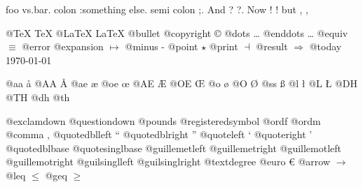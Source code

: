 \documentclass{book}
\begin{document}
foo vs.\@ bar. 
colon :\@And something else.
semi colon ;\@.
And ? ?\@.
Now ! !\@@
but , ,\@

@TeX \TeX{}
@LaTeX \LaTeX{}
@bullet \textbullet{}
@copyright \copyright{}
@dots \dots{}\@
@enddots \dots{}
@equiv $\equiv{}$
@error 
@expansion $\mapsto{}$
@minus -
@point $\star{}$
@print $\dashv{}$
@result $\Rightarrow{}$
@today \today{}

@aa \aa{}
@AA \AA{}
@ae \ae{}
@oe \oe{}
@AE \AE{}
@OE \OE{}
@o \o{}
@O \O{}
@ss \ss{}
@l \l{}
@L \L{}
@DH \DH{}
@TH \TH{}
@dh \dh{}
@th \th{}

@exclamdown \textexclamdown{}
@questiondown \textquestiondown{}
@pounds \textsterling{}
@registeredsymbol \circledR{}
@ordf \textordfeminine{}
@ordm \textordmasculine{}
@comma ,
@quotedblleft \textquotedblleft{}
@quotedblright \textquotedblright{}
@quoteleft \textquoteleft{}
@quoteright \textquoteright{}
@quotedblbase \quotedblbase{}
@quotesinglbase \quotesinglbase{}
@guillemetleft \guillemotleft{}
@guillemetright \guillemotright{}
@guillemotleft \guillemotleft{}
@guillemotright \guillemotright{}
@guilsinglleft \guilsinglleft{}
@guilsinglright \guilsinglright{}
@textdegree \textdegree{}
@euro \euro{}
@arrow $\rightarrow{}$
@leq $\leq{}$
@geq $\geq{}$
\end{document}
